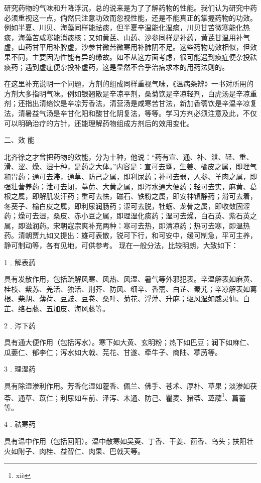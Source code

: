 \documentclass[a4paper,12pt,UTF8,twoside]{ctexbook}
\begin{document}
研究药物的气味和升降浮沉，总的说来是为了了解药物的性能。我们认为研究中药必须重视这一点，倘然只注意功效而忽视性能，还是不能真正的掌握药物的功效。例如半夏、川贝、海藻同样能祛痰，但半夏辛温能化湿痰，川贝甘苦微寒能化热痰，海藻苦咸寒能消痰核；又如黄芪、山药、沙参同样是补药，黄芪甘温用补气虚，山药甘平用补脾虚，沙参甘微苦微寒用补肺阴不足。这些药物功效相似，但效果不同，主要因为性能有异的缘故。如不从这方面考虑，很可能遇到痰症便杂投祛痰药；遇到虚症便杂投补虚药，这是显然不合乎治病求本的用药法则的。

在这里补充说明一个问题，方剂的组成同样重视气味，《温病条辨》一书对所用的方剂大多指明气味。例如银翘散是辛凉平剂，桑菊饮是辛凉轻剂，白虎汤是辛凉重剂；还指出清络饮是辛凉芳香法，清营汤是咸寒苦甘法，新加香薷饮是辛温辛凉复法，清暑益气汤是辛甘化阳和酸甘化阴复法，等等。学习方剂必须注意及此，不仅可以明确治疗的方针，还能理解药物组成方剂后的效用变化。

二、效 能

北齐徐之才曾把药物的效能，分为十种，他说：“药有宣、通、补、泄、轻、重、滑、涩、燥、湿十种，是药之大体。”内容是：宣可去壅，生姜、橘皮之属，即理气和胃药；通可去滞，通草、防己之属，即利尿药；补可去弱，人参、羊肉之属，即强壮营养药；泄可去闭，葶苈、大黄之属，即泻水通大便药；轻可去实，麻黄、葛根之属，即解肌发汗药；重可去怯，磁石、铁粉之属，即安神镇静药；滑可去着，冬葵子、榆白皮之属，即利尿润肠药；涩可去脱，牡蛎、龙骨之属，即收敛固涩药；燥可去湿，桑皮、赤小豆之属，即理湿化痰药；湿可去燥，白石英、紫石英之属，即滋润药。宋朝寇宗爽补充两种：寒可去热，即清凉药；热可去寒，即温热药。清朝贾九如又提出：雄可表散，锐可下行，和可安中，缓可制急，平可主养，静可制动等，各有见地，可供参考。
现在一般分法，比较明朗，大致如下：

1﹒解表药

具有发散作用，包括疏解风寒、风热、风湿、暑气等外邪犯表。辛温解表如麻黄、桂枝、紫苏、羌活、独活、荆芥、防风、细辛、香薷、白芷、秦艽；辛凉解表如葛根、柴胡、薄荷、豆豉、豆卷、桑叶、菊花、浮萍、升麻；驱风湿如威灵仙、白芷、络石藤、五加皮、海风藤等。

2﹒泻下药

具有通大便作用（包括泻水）。寒下如大黄、玄明粉；热下如巴豆；润下如麻仁、瓜蒌仁、郁李仁；泻水如大戟、芫花、甘遂、牵牛子、商陆、葶苈等。

3﹒理湿药

具有除湿渗利作用。芳香化湿如藿香、佩兰、佛手、苍术、厚朴、草果；淡渗如茯苓、通草、苡仁；利尿如车前、泽泻、木通、防己、瞿麦、猪苓、萆薢\footnote{xi\`e}、萹蓄等。

4﹒祛寒药

具有温中作用（包括回阳）。温中散寒如吴萸、丁香、干姜、茴香、乌头；扶阳壮火如附子、肉桂、益智仁、肉果、巴戟天等。
\end{document}
